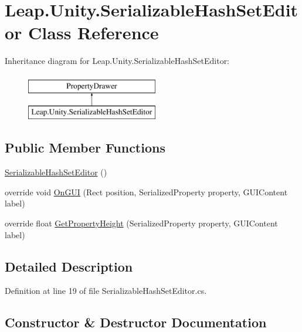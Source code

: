 \hypertarget{class_leap_1_1_unity_1_1_serializable_hash_set_editor}{}\section{Leap.\+Unity.\+Serializable\+Hash\+Set\+Editor Class Reference}
\label{class_leap_1_1_unity_1_1_serializable_hash_set_editor}
Inheritance diagram for Leap.\+Unity.\+Serializable\+Hash\+Set\+Editor\+:\begin{figure}[H]
\begin{center}
\leavevmode
\includegraphics[height=2.000000cm]{class_leap_1_1_unity_1_1_serializable_hash_set_editor}
\end{center}
\end{figure}
\subsection*{Public Member Functions}
\begin{DoxyCompactItemize}
\item 
\mbox{\hyperlink{class_leap_1_1_unity_1_1_serializable_hash_set_editor_a2878791dde8b3aabe712d9ba3526749c}{Serializable\+Hash\+Set\+Editor}} ()
\item 
override void \mbox{\hyperlink{class_leap_1_1_unity_1_1_serializable_hash_set_editor_adf9a92009da4406039ef0753826d173f}{On\+G\+UI}} (Rect position, Serialized\+Property property, G\+U\+I\+Content label)
\item 
override float \mbox{\hyperlink{class_leap_1_1_unity_1_1_serializable_hash_set_editor_aaf4c9ebaf338b9386ca150b875dbb432}{Get\+Property\+Height}} (Serialized\+Property property, G\+U\+I\+Content label)
\end{DoxyCompactItemize}


\subsection{Detailed Description}


Definition at line 19 of file Serializable\+Hash\+Set\+Editor.\+cs.



\subsection{Constructor \& Destructor Documentation}
\mbox{\label{class_leap_1_1_unity_1_1_serializable_hash_set_editor_a2878791dde8b3aabe712d9ba3526749c}} 
